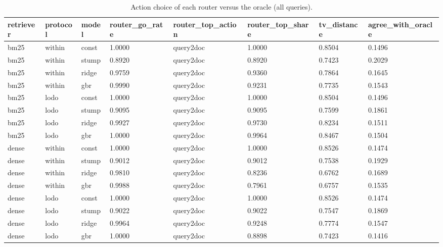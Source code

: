 \begin{table}[t]\centering\small
\caption{Action choice of each router versus the oracle (all queries).}\label{tab:c2}
\begin{tabular}{llllllll}
\toprule
retriever & protocol & model & router\_go\_rate & router\_top\_action & router\_top\_share & tv\_distance & agree\_with\_oracle \\
\midrule
bm25 & within & const & 1.0000 & query2doc & 1.0000 & 0.8504 & 0.1496 \\
bm25 & within & stump & 0.8920 & query2doc & 0.8920 & 0.7423 & 0.2029 \\
bm25 & within & ridge & 0.9759 & query2doc & 0.9360 & 0.7864 & 0.1645 \\
bm25 & within & gbr & 0.9990 & query2doc & 0.9231 & 0.7735 & 0.1543 \\
bm25 & lodo & const & 1.0000 & query2doc & 1.0000 & 0.8504 & 0.1496 \\
bm25 & lodo & stump & 0.9095 & query2doc & 0.9095 & 0.7599 & 0.1861 \\
bm25 & lodo & ridge & 0.9927 & query2doc & 0.9730 & 0.8234 & 0.1511 \\
bm25 & lodo & gbr & 1.0000 & query2doc & 0.9964 & 0.8467 & 0.1504 \\
dense & within & const & 1.0000 & query2doc & 1.0000 & 0.8526 & 0.1474 \\
dense & within & stump & 0.9012 & query2doc & 0.9012 & 0.7538 & 0.1929 \\
dense & within & ridge & 0.9810 & query2doc & 0.8236 & 0.6762 & 0.1689 \\
dense & within & gbr & 0.9988 & query2doc & 0.7961 & 0.6757 & 0.1535 \\
dense & lodo & const & 1.0000 & query2doc & 1.0000 & 0.8526 & 0.1474 \\
dense & lodo & stump & 0.9022 & query2doc & 0.9022 & 0.7547 & 0.1869 \\
dense & lodo & ridge & 0.9964 & query2doc & 0.9248 & 0.7774 & 0.1547 \\
dense & lodo & gbr & 1.0000 & query2doc & 0.8898 & 0.7423 & 0.1416 \\
\bottomrule
\end{tabular}
\end{table}
